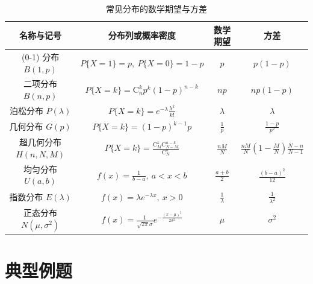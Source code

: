 \documentclass[lang=cn,11pt]{elegantbook}
\begin{document}
\begin{table}[h]
\centering
\caption{常见分布的数学期望与方差} \label{tab:dist-expect-var}
\begin{tabular}{c|c|c|c}
\toprule
名称与记号 & 分布列或概率密度 & 数学期望 & 方差 \\
\midrule
(0-1) 分布 $B(1,p)$ & $P\{X=1\}=p,\ P\{X=0\}=1-p$ & $p$ & $p(1-p)$ \\
二项分布 $B(n,p)$ & $P\{X=k\}=\mathrm{C}_n^k p^k (1-p)^{n-k}$ & $np$ & $np(1-p)$ \\
泊松分布 $P(\lambda)$ & $P\{X=k\}=e^{-\lambda}\frac{\lambda^k}{k!}$ & $\lambda$ & $\lambda$ \\
几何分布 $G(p)$ & $P\{X=k\}=(1-p)^{k-1}p$ & $\frac{1}{p}$ & $\frac{1-p}{p^2}$ \\
超几何分布 $H(n,N,M)$ & $P\{X=k\}=\frac{\mathrm{C}_M^k \mathrm{C}_{N-M}^{n-k}}{\mathrm{C}_N^n}$ & $\frac{nM}{N}$ & $\frac{nM}{N}\left(1-\frac{M}{N}\right)\frac{N-n}{N-1}$ \\
均匀分布 $U(a,b)$ & $f(x)=\frac{1}{b-a},\ a < x < b$ & $\frac{a+b}{2}$ & $\frac{(b-a)^2}{12}$ \\
指数分布 $E(\lambda)$ & $f(x)=\lambda e^{-\lambda x},\ x > 0$ & $\frac{1}{\lambda}$ & $\frac{1}{\lambda^2}$ \\
正态分布 $N(\mu,\sigma^2)$ & $f(x)=\frac{1}{\sqrt{2\pi}\sigma}e^{-\frac{(x-\mu)^2}{2\sigma^2}}$ & $\mu$ & $\sigma^2$ \\
\bottomrule
\end{tabular}
\end{table}


\section{典型例题}
\end{document}
